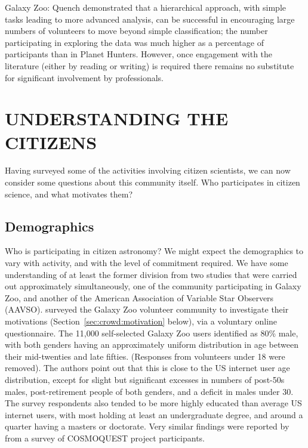 \documentclass{ar2e}
\def\Sref#1{Section~\ref{#1}\xspace}
\def\CaseStudy#1{\noindent{\it\bf #1 \,\,\,\,}}
\begin{document}

Galaxy Zoo: Quench demonstrated that a hierarchical approach, with simple tasks leading to
more advanced analysis, can be successful in encouraging large numbers of
volunteers to move beyond simple classification; the number participating in
exploring the data was much higher as a percentage of participants than in
Planet Hunters. However, once engagement with the literature (either by reading
or writing) is required there remains no substitute for significant involvement
by professionals. 



% 




\section{UNDERSTANDING THE CITIZENS}
\label{sec:crowd}

Having surveyed some of the activities involving citizen scientists, we can
now consider some questions about this community itself. Who participates in
citizen science, and what motivates them?



\subsection{Demographics}
\label{sec:crowd:demographics}

Who is participating in citizen astronomy? We might expect the demographics to
vary with activity, and with the level of commitment required. We have some
understanding of at least the former division from two studies that were
carried out approximately simultaneously, one of the community  participating
in Galaxy Zoo, and another of the American Association of Variable Star
Observers (AAVSO).  \citet{Rad++2013} surveyed the Galaxy Zoo volunteer
community to investigate their motivations (\Sref{sec:crowd:motivation}
below), via a voluntary online questionnaire. The 11,000 self-selected Galaxy
Zoo users identified as 80\% male, with both genders having an approximately
uniform distribution in age between their mid-twenties and late fifties.
(Responses from volunteers under 18 were removed). The
authors point out that this is close to the US internet user age distribution,
except for slight but significant excesses in numbers of post-50s males,
post-retirement people of both genders, and a deficit in males under 30. The
survey respondents  also tended to be more highly educated than average US
internet users, with most holding at least an undergraduate degree, and around
a quarter having a masters or doctorate. Very similar findings were reported
by \citet{COSMOQUESTsurvey} from a survey of COSMOQUEST project participants.
\end{document}
